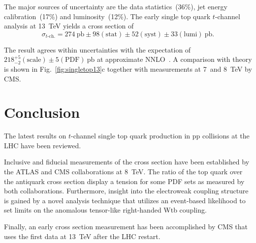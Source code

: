 \documentclass{PoS}
\begin{document}
The major sources of uncertainty are the data statistics~(36\%), jet energy calibration~(17\%) and luminosity~(12\%).
The early single top quark $t$-channel analysis at 13~TeV yields a cross section of
\begin{equation}
\sigma_{t\mbox{-}\mathrm{ch.}}=274~\mathrm{pb}\pm98\mathrm{(stat)}\pm52\mathrm{(syst)}\pm33\mathrm{(lumi)}~\mathrm{pb}.
\end{equation}

The result agrees within uncertainties with the expectation of $218_{-2}^{+5}\mathrm{(scale)}\pm5\mathrm{(PDF)}~\mathrm{pb}$ at approximate NNLO~\cite{Kidonakis-8tev}. A comparison with theory is shown in Fig.~\ref{fig:singletop13}c together with measurements at 7~and 8~TeV by CMS.

\section{Conclusion}
The latest results on $t$-channel single top quark production in pp collisions at the LHC have been reviewed.

Inclusive and fiducial measurements of the cross section have been established by the ATLAS and CMS collaborations at 8~TeV. The ratio of the top quark over the antiquark cross section display a tension for some PDF sets as measured by both collaborations. Furthermore, insight into the electroweak coupling structure is gained by a novel analysis technique that utilizes an event-based likelihood to set limits on the anomalous tensor-like right-handed Wtb coupling.

Finally, an early cross section measurement has been accomplished by CMS that uses the first data at 13~TeV after the LHC restart.
\end{document}
